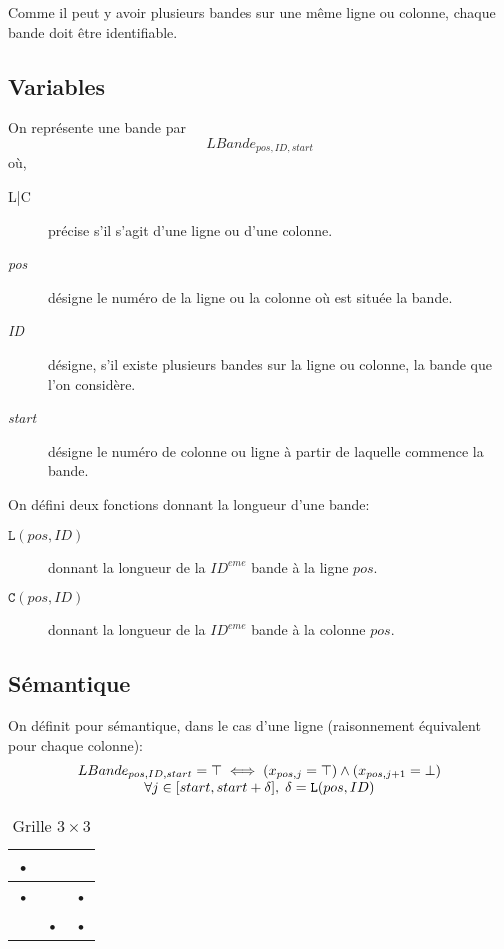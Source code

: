 \documentclass[a4paper,12pt]{report}
\newcommand\black{\cellcolor{black}}
\begin{document}
Comme il peut y avoir plusieurs bandes sur une même ligne ou colonne, chaque bande doit être identifiable.

\subsection{Variables}

On représente une bande par $$LBande_{pos,ID,start}$$
où,
\begin{description}
\item[L|C] précise s'il s'agit d'une ligne ou d'une colonne.
\item[\textit{pos}] désigne le numéro de la ligne ou la colonne où est située la bande.
\item[\textit{ID}] désigne, s'il existe plusieurs bandes sur la ligne ou colonne, la bande que l'on considère.
\item[\textit{start}] désigne le numéro de colonne ou ligne à partir de laquelle commence la bande.\\
\end{description}

On défini deux fonctions donnant la longueur d'une bande:
\begin{description}
\item[$\mathtt{L}(pos,ID)$] donnant la longueur de la $ID^{eme}$ bande à la ligne $pos$.
\item[$\mathtt{C}(pos,ID)$] donnant la longueur de la $ID^{eme}$ bande à la colonne $pos$.
\end{description} 

\subsection{Sémantique}
On définit pour sémantique, dans le cas d'une ligne (raisonnement équivalent pour chaque colonne):
\begin{equation}
\begin{array}[b]{c}
      LBande_{pos,ID,start} = \top \iff (x_{pos,j}=\top)\wedge (x_{pos,j+1}=\bot)\\
	\forall j \in [start,start+\delta],\;\delta = \mathtt{L}(pos,ID)      
\end{array}
\end{equation}

\begin{table}[H]
   \centering
	\begin{tabular}{|c|c|c|}
	\hline 
	\black• &  &  \\ 
	\hline 
	\black• &  & \black• \\ 
	\hline 
	 & \black• & \black• \\ 
	\hline 
	\end{tabular}
\caption{\label{Grille3X3} Grille $3\times3$}
\end{table}
\end{document}
